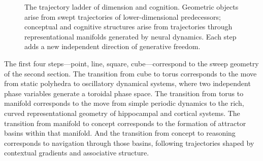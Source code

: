\documentclass[11pt, a4paper]{article}
\theoremstyle{plain}
\theoremstyle{definition}
\theoremstyle{remark}
\begin{document}
\begin{figure}[h]
\centering
{}
\caption{The trajectory ladder of dimension and cognition. Geometric objects arise
from swept trajectories of lower-dimensional predecessors; conceptual and cognitive
structures arise from trajectories through representational manifolds generated by
neural dynamics. Each step adds a new independent direction of generative freedom.}
\end{figure}

The first four steps---point, line, square, cube---correspond to the sweep geometry
of the second section. The transition from cube to torus corresponds to the move from
static polyhedra to oscillatory dynamical systems, where two independent phase variables
generate a toroidal phase space. The transition from torus to manifold corresponds to
the move from simple periodic dynamics to the rich, curved representational geometry
of hippocampal and cortical systems. The transition from manifold to concept corresponds
to the formation of attractor basins within that manifold. And the transition from
concept to reasoning corresponds to navigation through those basins, following
trajectories shaped by contextual gradients and associative structure.
\end{document}
